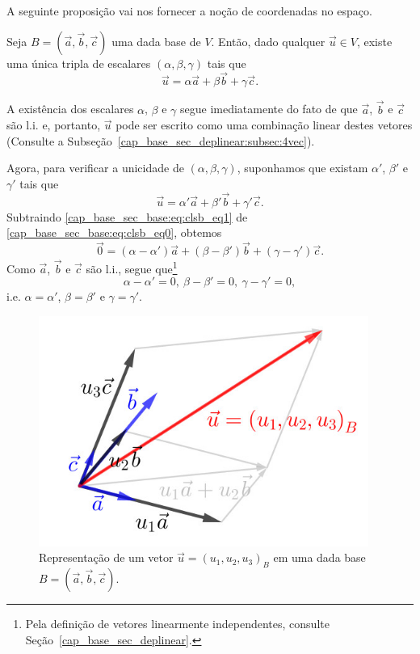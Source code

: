 A seguinte proposição vai nos fornecer a noção de coordenadas no espaço.

\begin{proposicao}
  Seja $B = \left(\vec{a}, \vec{b}, \vec{c}\right)$ uma dada base de $V$. Então, dado qualquer $\vec{u}\in V$, existe uma única tripla de escalares $\left(\alpha, \beta, \gamma\right)$ tais que
  \begin{equation}\label{cap_base_sec_base:eq:clsb_eq0}
    \vec{u} = \alpha\vec{a} + \beta\vec{b} + \gamma\vec{c}.
  \end{equation}  
\end{proposicao}
\begin{demonstracao}
  A existência dos escalares $\alpha$, $\beta$ e $\gamma$ segue imediatamente do fato de que $\vec{a}$, $\vec{b}$ e $\vec{c}$ são l.i. e, portanto, $\vec{u}$ pode ser escrito como uma combinação linear destes vetores (Consulte a Subseção~\ref{cap_base_sec_deplinear:subsec:4vec}). 
  
  Agora, para verificar a unicidade de $\left(\alpha, \beta, \gamma\right)$, suponhamos que existam $\alpha'$, $\beta'$ e $\gamma'$ tais que
\begin{equation}\label{cap_base_sec_base:eq:clsb_eq1}
  \vec{u} = \alpha'\vec{a} + \beta'\vec{b} + \gamma'\vec{c}.
\end{equation}
Subtraindo \eqref{cap_base_sec_base:eq:clsb_eq1} de \eqref{cap_base_sec_base:eq:clsb_eq0}, obtemos
\begin{equation}
  \vec{0} = (\alpha-\alpha')\vec{a}+(\beta-\beta')\vec{b}+(\gamma-\gamma')\vec{c}.
\end{equation}
Como $\vec{a}$, $\vec{b}$ e $\vec{c}$ são l.i., segue que\footnote{Pela definição de vetores linearmente independentes, consulte Seção~\ref{cap_base_sec_deplinear}.}
\begin{equation}
  \alpha-\alpha'=0,~\beta-\beta'=0,~\gamma-\gamma'=0,
\end{equation}
i.e. $\alpha=\alpha'$, $\beta=\beta'$ e $\gamma=\gamma'$.
\end{demonstracao}

\begin{figure}[h]
  \centering
  \includegraphics[width=4.25in]{./cap_base/dados/fig_coord/fig.jpg}
  \caption{Representação de um vetor $\vec{u} = (u_1, u_2, u_3)_B$ em uma dada base $B=(\vec{a},\vec{b},\vec{c})$.}
  \label{cap_base_sec_base:fig:coord}
\end{figure}

